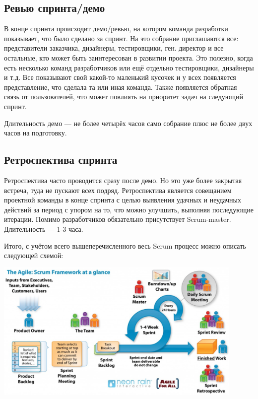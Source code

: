 \documentclass{../../text-style}
\begin{document}
\subsection{Ревью спринта/демо}

В конце спринта происходит демо/ревью, на котором команда разработки показывает, что было сделано за спринт. На это собрание приглашаются все: представители заказчика, дизайнеры, тестировщики, ген. директор и все остальные, кто может быть заинтересован в развитии проекта. Это полезно, когда есть несколько команд разработчиков или ещё отдельно тестировщики, дизайнеры и т.д. Все показывают свой какой-то маленький кусочек и у всех появляется представление, что сделала та или иная команда. Также появляется обратная связь от пользователей, что может повлиять на приоритет задач на следующий спринт. 

Длительность демо --- не более четырёх часов само собрание плюс не более двух часов на подготовку.

\subsection{Ретроспектива спринта}

Ретроспектива часто проводится сразу после демо. Но это уже более закрытая встреча, туда не пускают всех подряд. Ретроспектива является совещанием проектной команды в конце спринта с целью выявления удачных и неудачных действий за период с упором на то, что можно улучшить, выполняя последующие итерации. Помимо разработчиков обязательно присутствует Scrum-master. Длительность --- 1-3 часа.

Итого, с учётом всего вышеперечисленного весь Scrum процесс можно описать следующей схемой:

\begin{center}
    \includegraphics[width=0.9\textwidth]{scrumProcess.png}
\end{center}
\end{document}
